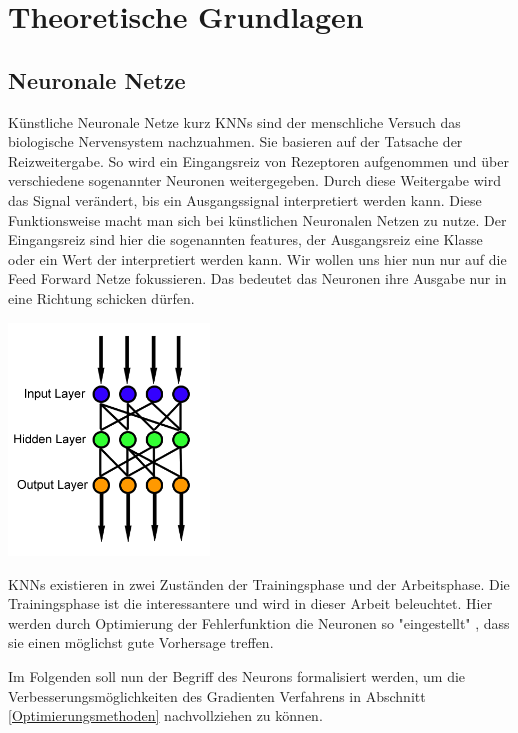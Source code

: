 
\section{Theoretische Grundlagen}\label{Theoretische Grundlagen}


\subsection{Neuronale Netze}\label{Neuronale Netze}

Künstliche Neuronale Netze kurz KNNs sind der menschliche
Versuch das biologische Nervensystem nachzuahmen.
Sie basieren auf der Tatsache der Reizweitergabe. 
So wird ein Eingangsreiz von Rezeptoren aufgenommen 
und über verschiedene sogenannter Neuronen weitergegeben.
Durch diese Weitergabe wird das Signal verändert,
bis ein Ausgangssignal interpretiert werden kann. 
Diese Funktionsweise macht man sich bei künstlichen
Neuronalen Netzen zu nutze.
Der Eingangsreiz sind hier 
die sogenannten \grqq features\grqq{}, 
der Ausgangsreiz eine Klasse oder ein Wert
der interpretiert werden kann.
Wir wollen uns hier nun nur auf die \grqq Feed Forward\grqq{}
Netze fokussieren. Das bedeutet das Neuronen ihre Ausgabe
nur in eine Richtung schicken dürfen.


\begin{center}
 \includegraphics[width=0.4\textwidth]{abb/Feed_forward_neural_net.png}
\end{center}


KNNs existieren in zwei Zuständen der Trainingsphase
und der Arbeitsphase. 
Die Trainingsphase ist die interessantere und wird in
dieser Arbeit beleuchtet. Hier werden durch Optimierung 
der Fehlerfunktion die Neuronen so "eingestellt" ,
dass sie einen möglichst gute Vorhersage treffen. 

Im Folgenden soll nun der Begriff des Neurons formalisiert 
werden, um die Verbesserungsmöglichkeiten des Gradienten
Verfahrens in Abschnitt \ref{Optimierungsmethoden} 
nachvollziehen zu können.

